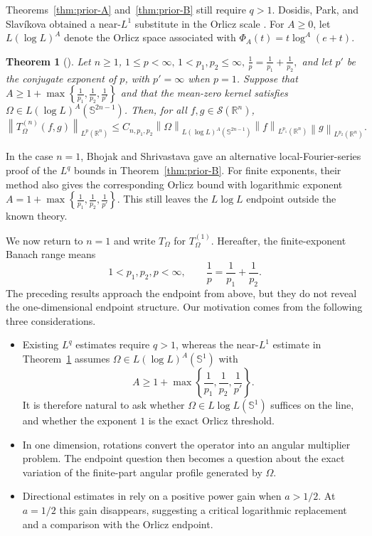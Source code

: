 \documentclass[11pt]{amsart}
\newtheorem{priorresult}{Theorem}
\theoremstyle{remark}
\numberwithin{equation}{section}
\newcommand{\R}{\mathbb R}
\newcommand{\Sph}{\mathbb S^1}
\newcommand{\norm}[1]{\left\lVert #1\right\rVert}
\begin{document}
	Theorems~\ref{thm:prior-A} and~\ref{thm:prior-B} still require \(q>1\).
	Dosidis, Park, and Slav\'ikova obtained a near-\(L^1\) substitute in the
	Orlicz scale \cite[Theorem~3]{DosidisParkSlavikova2026}.  For \(A\ge0\), let
	\(L(\log L)^A\) denote the Orlicz space associated with
	\(\Phi_A(t)=t\log^A(e+t)\).
	
	\begin{priorresult}[\cite{DosidisParkSlavikova2026}]
		\label{thm:prior-C}
		Let \(n\ge1\),
		$
		1\le p<\infty,
		\,
		1<p_1,p_2\le\infty,
		\,
		\frac1p=\frac1{p_1}+\frac1{p_2},
		$
		and let \(p'\) be the conjugate exponent of \(p\), with \(p'=\infty\)
		when \(p=1\).  Suppose that
		$
		A\ge1+\max\left\{
		\frac1{p_1},\frac1{p_2},\frac1{p'}
		\right\}
		$
		and that the mean-zero kernel satisfies
		\(\Omega\in L(\log L)^A(\mathbb S^{2n-1})\).  Then, for all
		\(f,g\in\mathcal S(\R^n)\),
		\[
		\norm{T_\Omega^{(n)}(f,g)}_{L^p(\R^n)}
		\le
		C_{n,p_1,p_2}
		\norm{\Omega}_{L(\log L)^A(\mathbb S^{2n-1})}
		\norm f_{L^{p_1}(\R^n)}\norm g_{L^{p_2}(\R^n)}.
		\]
	\end{priorresult}
	
	In the case \(n=1\), Bhojak and Shrivastava
	\cite[Theorems~1.1 and~1.3]{BhojakShrivastava2025} gave an alternative
	local-Fourier-series proof of the \(L^q\) bounds in
	Theorem~\ref{thm:prior-B}.  For finite exponents, their method also gives the
	corresponding Orlicz bound with logarithmic exponent
	$
	A=1+\max\left\{
	\frac1{p_1},\frac1{p_2},\frac1{p'}
	\right\}.
	$
	This still leaves the \(L\log L\) endpoint outside the known theory.
	
	We now return to \(n=1\) and write \(T_\Omega\) for \(T_\Omega^{(1)}\).
	Hereafter, the finite-exponent Banach range means
	\[
	1<p_1,p_2,p<\infty,
	\qquad
	\frac1p=\frac1{p_1}+\frac1{p_2}.
	\]
	The preceding results approach the endpoint from above, but they do not reveal
	the one-dimensional endpoint structure.  Our motivation comes from the
	following three considerations.
	\begin{itemize}
		\item Existing \(L^q\) estimates require \(q>1\), whereas the near-\(L^1\)
		estimate in Theorem~\ref{thm:prior-C} assumes
		\(\Omega\in L(\log L)^A(\Sph)\) with
		\[
		A\ge 1+\max\left\{
		\frac1{p_1},\frac1{p_2},\frac1{p'}
		\right\}.
		\]
		It is therefore natural to ask whether \(\Omega\in L\log L(\Sph)\) suffices
		on the line, and whether the exponent \(1\) is the exact Orlicz threshold.
		
		\item In one dimension, rotations convert the operator into an angular
		multiplier problem.  The endpoint question then becomes a question about the
		exact variation of the finite-part angular profile generated by \(\Omega\).
		
		\item Directional estimates in \cite{DQX0404} rely on a positive power gain
		when \(a>1/2\).  At \(a=1/2\) this gain disappears, suggesting a critical
		logarithmic replacement and a comparison with the Orlicz endpoint.
	\end{itemize}
	
\end{document}
